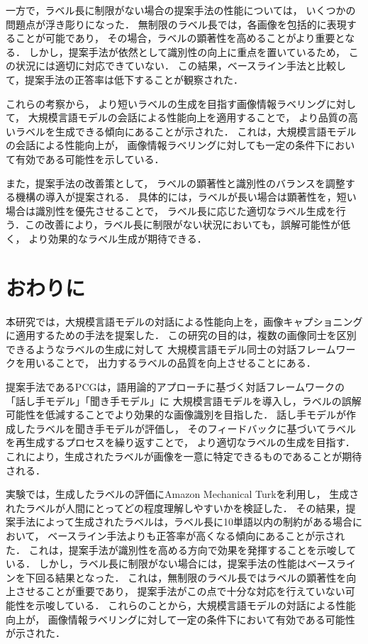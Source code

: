\documentclass[a4paper,11pt]{jreport}
\begin{document}
一方で，ラベル長に制限がない場合の提案手法の性能については，
いくつかの問題点が浮き彫りになった．
無制限のラベル長では，各画像を包括的に表現することが可能であり，
その場合，ラベルの顕著性を高めることがより重要となる．
しかし，提案手法が依然として識別性の向上に重点を置いているため，
この状況には適切に対応できていない．
この結果，ベースライン手法と比較して，提案手法の正答率は低下することが観察された．

これらの考察から，
より短いラベルの生成を目指す画像情報ラベリングに対して，
大規模言語モデルの会話による性能向上を適用することで，
より品質の高いラベルを生成できる傾向にあることが示された．
これは，大規模言語モデルの会話による性能向上が，
画像情報ラベリングに対しても一定の条件下において有効である可能性を示している．

また，提案手法の改善策として，
ラベルの顕著性と識別性のバランスを調整する機構の導入が提案される．
具体的には，ラベルが長い場合は顕著性を，短い場合は識別性を優先させることで，
ラベル長に応じた適切なラベル生成を行う．この改善により，ラベル長に制限がない状況においても，誤解可能性が低く，
より効果的なラベル生成が期待できる．

\chapter{おわりに}

本研究では，大規模言語モデルの対話による性能向上を，画像キャプショニングに適用するための手法を提案した．
この研究の目的は，複数の画像同士を区別できるようなラベルの生成に対して
大規模言語モデル同士の対話フレームワークを用いることで，
出力するラベルの品質を向上させることにある．

提案手法であるPCGは，語用論的アプローチに基づく対話フレームワークの「話し手モデル」「聞き手モデル」に
大規模言語モデルを導入し，ラベルの誤解可能性を低減することでより効果的な画像識別を目指した．
話し手モデルが作成したラベルを聞き手モデルが評価し，
そのフィードバックに基づいてラベルを再生成するプロセスを繰り返すことで，
より適切なラベルの生成を目指す．
これにより，生成されたラベルが画像を一意に特定できるものであることが期待される．

実験では，生成したラベルの評価にAmazon Mechanical Turkを利用し，
生成されたラベルが人間にとってどの程度理解しやすいかを検証した．
その結果，提案手法によって生成されたラベルは，ラベル長に10単語以内の制約がある場合において，
ベースライン手法よりも正答率が高くなる傾向にあることが示された．
これは，提案手法が識別性を高める方向で効果を発揮することを示唆している．
しかし，ラベル長に制限がない場合には，提案手法の性能はベースラインを下回る結果となった．
これは，無制限のラベル長ではラベルの顕著性を向上させることが重要であり，
提案手法がこの点で十分な対応を行えていない可能性を示唆している．
これらのことから，大規模言語モデルの対話による性能向上が，
画像情報ラベリングに対して一定の条件下において有効である可能性が示された．
\end{document}
